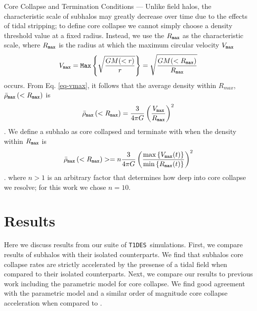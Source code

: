 \documentclass[%
 reprint,
 amsmath,
 amssymb,
 aps,
]{revtex4-2}
\def\tides{{\tt T1DES}~}
\newcommand{\refeq}[1]{Eq. \ref{#1}}
\begin{document}
Core Collapse and Termination Conditions --- 
Unlike field halos, the characteristic scale of subhalos may greatly decrease over time due to the effects of tidal stripping; to define core collapse we cannot simply choose a density threshold value at a fixed radius. 
Instead, we use the $R_{\tt max}$ as the characteristic scale, where $R_{\tt max}$ is the radius at which the maximum circular velocity $V_{\tt max}$ 
\begin{equation}\label{eq-vmax}
    V_{\tt max} = {\tt Max}\left \{ \sqrt{\frac{G M(<r)}{r}} \right \} = \sqrt{\frac{G M(<R_{\tt max})}{R_{\tt max}}}
\end{equation}
occurs.
From \refeq{eq-vmax}, it follows that the average density within $R_{max}$, $\bar{\rho}_{\tt max} \left(< R_{\tt max} \right)$ is
\begin{equation}
 \bar{\rho}_{\tt max} \left(< R_{\tt max} \right) = \frac{3}{4 \pi G} \left( \frac{V_{\tt max}}{R_{\tt max}} \right)^2 
\end{equation}. 
We define a subhalo as core collapsed and terminate with when the density within $R_{\tt max}$ is 
\begin{equation}\label{eq-collapse-threshold}
 \bar{\rho}_{\tt max} \left (< R_{\tt max} \right ) >= n\frac{3}{4 \pi G} \left( \frac{\max{\{V_{\tt max}(t)\}}}{\min{ \{ R_{\tt max}(t) \} }} \right)^2  
\end{equation}. 
where $n > 1$ is an arbitrary factor that determines how deep into core collapse we resolve; for this work we chose $n = 10$.

\section{Results}\label{sec-results}

Here we discuss results from our suite of \tides simulations. First, we compare results of subhalos with their isolated counterparts. We find that subhalos core collapse rates are strictly accelerated by the presense of a tidal field when compared to their isolated counterparts. Next, we compare our results to previous work including the \citet{yang2024parametric} parametric model for core collapse.  We find good agreement with the parametric model and a similar order of magnitude core collapse acceleration when compared to \citet{nadler2025sidm}.
\end{document}
